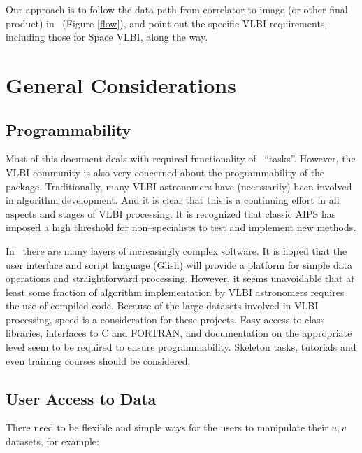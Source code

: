 Our approach is to follow the data path from correlator to image (or
other final product) in \aipspp\ (Figure \ref{flow}), and point out
the specific VLBI requirements, including those for Space VLBI, 
along the way. 

\section{General Considerations}

\subsection{Programmability}

Most of this document deals with required functionality of \aipspp\ 
``tasks''. However, the VLBI community is also very concerned about
the programmability of the package. Traditionally, many VLBI
astronomers have (necessarily) been involved in algorithm development.
And it is clear that this is a continuing effort in all aspects and
stages of VLBI processing. It is recognized that classic AIPS has
imposed a high threshold for non--specialists to test and implement
new methods.

In \aipspp\ there are many layers of increasingly complex software. It
is hoped that the user interface and script language (Glish) will
provide a platform for simple data operations and straightforward
processing. However, it seems unavoidable that at least some fraction
of algorithm implementation by VLBI astronomers requires the use of
compiled code. Because of the large datasets involved in VLBI
processing, speed is a consideration for these projects. Easy access
to class libraries, interfaces to C and FORTRAN, and documentation on
the appropriate level seem to be required to ensure programmability.
Skeleton tasks, tutorials and even training courses should be
considered.

\subsection{User Access to Data}

There need to be flexible and simple ways for the users to manipulate
their $u,\! v$ datasets, for example:

